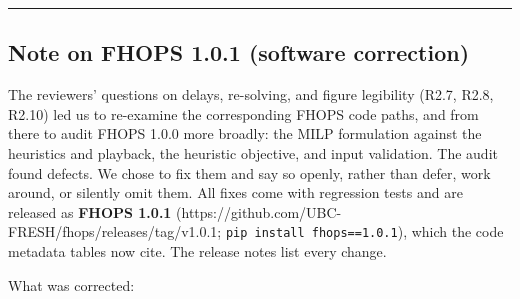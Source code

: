 \begin{center}\rule{0.5\linewidth}{0.5pt}\end{center}

\subsection*{Note on FHOPS 1.0.1 (software
correction)}\label{note-on-fhops-1.0.1-software-correction}

The reviewers' questions on delays, re-solving, and figure legibility
(R2.7, R2.8, R2.10) led us to re-examine the corresponding FHOPS code
paths, and from there to audit FHOPS 1.0.0 more broadly: the MILP
formulation against the heuristics and playback, the heuristic
objective, and input validation. The audit found defects. We chose to
fix them and say so openly, rather than defer, work around, or silently
omit them. All fixes come with regression tests and are released as
\textbf{FHOPS 1.0.1}
(https://github.com/UBC-FRESH/fhops/releases/tag/v1.0.1;
\texttt{pip\ install\ fhops==1.0.1}), which the code metadata tables now
cite. The release notes list every change.

What was corrected:

